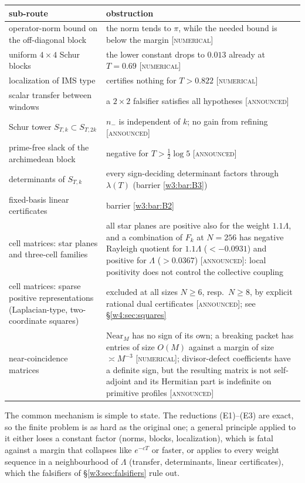 \documentclass[11pt]{amsart}
\theoremstyle{definition}
\theoremstyle{remark}
\numberwithin{equation}{section}
\newcommand{\lam}{\lambda(T)}                          %
\newcommand{\stag}[1]{\textsc{[#1]}}
\newcommand{\NUM}{\stag{numerical}}
\newcommand{\ANNOUNCED}{\stag{announced}}
\begin{document}
\begin{center}\small
\renewcommand{\arraystretch}{1.15}
\begin{tabular}{p{4.6cm}p{8.6cm}}
\hline
sub-route & obstruction\\
\hline
operator-norm bound on the off-diagonal block & the norm tends to $\pi$, while the needed bound is below the margin \NUM\\
uniform $4\times4$ Schur blocks & the lower constant drops to $0.013$ already at $T=0.69$ \NUM\\
localization of IMS type & certifies nothing for $T>0.822$ \NUM\\
scalar transfer between windows & a $2\times2$ falsifier satisfies all hypotheses \ANNOUNCED\\
Schur tower $S_{T,k}\subset S_{T,2k}$ & $n_-$ is independent of $k$; no gain from refining \ANNOUNCED\\
prime-free slack of the archimedean block & negative for $T>\frac12\log5$ \ANNOUNCED\\
determinants of $S_{T,k}$ & every sign-deciding determinant factors through $\lam$ (barrier \ref{w3:bar:B3})\\
fixed-basis linear certificates & barrier \ref{w3:bar:B2}\\
cell matrices: star planes and three-cell families & all star planes are positive also for the weight $1.1\Lambda$, and a
combination of $F_k$ at $N=256$ has negative Rayleigh quotient for $1.1\Lambda$ ($<-0.0931$) and positive for $\Lambda$
($>0.0367$) \ANNOUNCED: local positivity does not control the collective coupling\\
cell matrices: sparse positive representations (Laplacian-type, two-coordinate squares) & excluded at all sizes $N\ge6$,
resp.\ $N\ge8$, by explicit rational dual certificates \ANNOUNCED; see \S\ref{w4:sec:squares}\\
near-coincidence matrices & $\mathrm{Near}_M$ has no sign of its own; a breaking packet has entries of size $O(M)$
against a margin of size $\asymp M^{-3}$ \NUM; divisor-defect coefficients have a definite sign, but the resulting
matrix is not self-adjoint and its Hermitian part is indefinite on primitive profiles \ANNOUNCED\\
\hline
\end{tabular}
\end{center}

The common mechanism is simple to state. The reductions (E1)--(E3) are exact, so the finite problem is as hard as the original one;
a general principle applied to it either loses a constant factor (norms, blocks, localization), which is fatal against a
margin that collapses like $e^{-cT}$ or faster, or applies to every weight sequence in a neighbourhood of $\Lambda$
(transfer, determinants, linear certificates), which the falsifiers of \S\ref{w3:sec:falsifiers} rule out.
\end{document}
